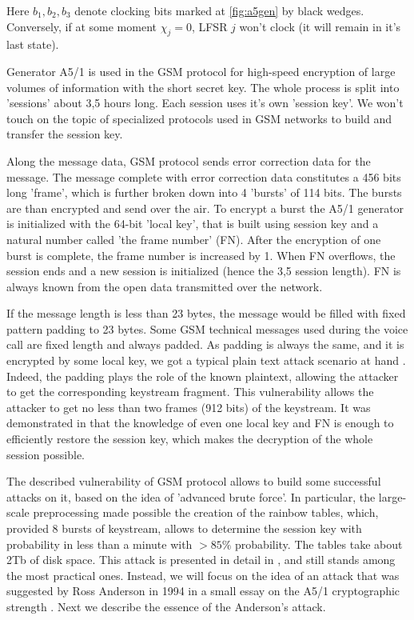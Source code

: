 \documentclass[runningheads,a4paper]{llncs}[2015/06/24]
\begin{document}
Here $b_1,b_2,b_3$ denote clocking bits marked at \cref{fig:a5gen} by black
wedges. Conversely, if at some moment $\chi_j=0$, LFSR $j$ won't clock (it will
remain in it's last state).

Generator A5/1 is used in the GSM protocol for high-speed encryption of large
volumes of information with the short secret key. The whole process is split
into 'sessions' about 3,5 hours long. Each session uses it's own 'session key'.
We won't touch on the topic of specialized protocols used in GSM networks to
build and transfer the session key.

Along the message data, GSM protocol sends error correction data for the
message. The message complete with error correction data constitutes a 456 bits
long 'frame', which is further broken down into 4 'bursts' of 114 bits. The
bursts are than encrypted and send over the air. To encrypt a burst the A5/1
generator is initialized with the 64-bit 'local key', that is built using
session key and a natural number called 'the frame number' (FN). After the
encryption of one burst is complete, the frame number is increased by 1. When
FN overflows, the session ends and a new session is initialized (hence the 3,5
session length). FN is always known from the open data transmitted over the
network. 

If the message length is less than 23 bytes, the message would be filled with
fixed pattern padding to 23 bytes. Some GSM technical messages used during the
voice call are fixed length and always padded. As padding is always the same,
and it is encrypted by some local key, we got a typical plain text attack
scenario at hand \cite{MENEZES}. Indeed, the padding plays the role of the
known plaintext, allowing the attacker to get the corresponding keystream
fragment. This vulnerability allows the attacker to get no less than two frames
(912 bits) of the keystream. It was demonstrated in \cite{UNKN1} that the
knowledge of even one local key and FN is enough to efficiently restore the
session key, which makes the decryption of the whole session possible.


The described vulnerability of GSM protocol allows to build some successful
attacks on it, based on the idea of 'advanced brute force'. In particular, the
large-scale preprocessing made possible the creation of the rainbow tables,
which, provided 8 bursts of keystream, allows to determine the session key with
probability in less than a minute with $>85\%$ probability. The tables take
about 2Tb of disk space. This attack is presented in detail in \cite{RAINBOW},
and still stands among the most practical ones. Instead, we will focus on the
idea of an attack that was suggested by Ross Anderson in 1994 in a small essay
on the A5/1 cryptographic strength \cite{ANDERSON}. Next we describe the
essence of the Anderson's attack.
\end{document}
